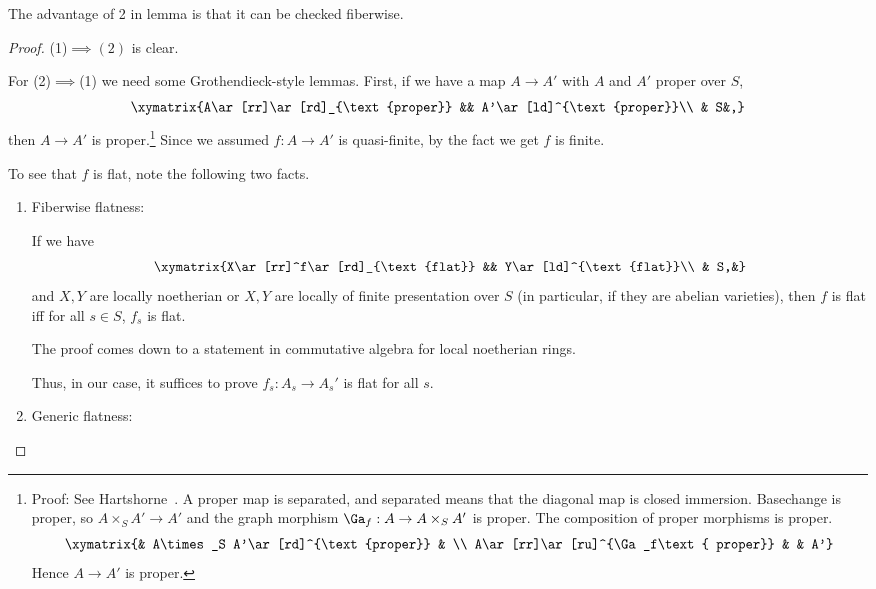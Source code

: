 The advantage of 2 in lemma is that it can be checked fiberwise. %
\begin{proof}
(1)$\implies (2)$ is clear.

For (2)$\implies$(1) we need some Grothendieck-style lemmas. %
First, if we have a map $A\to A'$ with $A$ and $A'$ proper over $S$,
\[
\xymatrix{A\ar[rr]\ar[rd]_{\text{proper}} && A'\ar[ld]^{\text{proper}}\\ & S&,}
\]
then $A\to A'$ is proper.\footnote{Proof: 
See Hartshorne~\cite[Exercise 4.8e]{Ha77}. 
A proper map is separated, and separated means that the diagonal map is closed immersion. Basechange is proper, so $A\times_SA'\to A'$ and the graph morphism $\Ga_f:A\to A\times_SA'$ is proper. The composition of proper morphisms is proper.
\[
\xymatrix{& A\times_S A'\ar[rd]^{\text{proper}} & \\
A\ar[rr]\ar[ru]^{\Ga_f\text{ proper}} & & A'}
\]
Hence $A\to A'$ is proper.} %
Since we assumed $f:A\to A'$ is quasi-finite, by the fact we get $f$ is finite.


To see that $f$ is flat, note the following two facts.
\begin{enumerate}
\item
Fiberwise flatness: 

\begin{pr}
If we have
\[
\xymatrix{X\ar[rr]^f\ar[rd]_{\text{flat}} && Y\ar[ld]^{\text{flat}}\\ & S,&}
\]
and $X,Y$ are locally noetherian or $X,Y$ are locally of finite presentation over $S$ (in particular, if they are abelian varieties), then $f$ is flat iff for all $s\in S$, $f_s$ is flat.
\end{pr}

The proof comes down to a statement in commutative algebra for local noetherian rings. 

Thus, in our case, it suffices to prove $f_s:A_s\to A_s'$ is flat for all $s$.
\item 
Generic flatness: 


\end{enumerate}
\end{proof}
